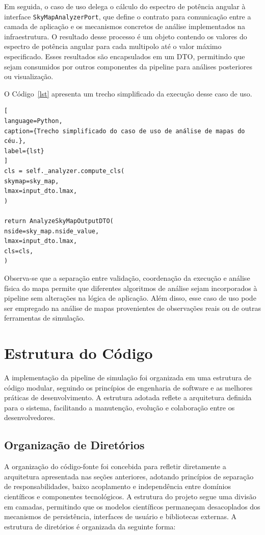 Em seguida, o caso de uso delega o cálculo do espectro de potência angular à interface \texttt{SkyMapAnalyzerPort}, que define o contrato para comunicação entre a camada de aplicação e os mecanismos concretos de análise implementados na infraestrutura. O resultado desse processo é um objeto contendo os valores do espectro de potência angular para cada multipolo até o valor máximo especificado. Esses resultados são encapsulados em um DTO, permitindo que sejam consumidos por outros componentes da pipeline para análises posteriores ou visualização.

O Código~\ref{lst} apresenta um trecho simplificado da execução desse caso de uso.


\begin{lstlisting}[
language=Python,
caption={Trecho simplificado do caso de uso de análise de mapas do céu.},
label={lst}
]
cls = self._analyzer.compute_cls(
skymap=sky_map,
lmax=input_dto.lmax,
)

return AnalyzeSkyMapOutputDTO(
nside=sky_map.nside_value,
lmax=input_dto.lmax,
cls=cls,
)
\end{lstlisting}

Observa-se que a separação entre validação, coordenação da execução e análise física do mapa permite que diferentes algoritmos de análise sejam incorporados à pipeline sem alterações na lógica de aplicação. Além disso, esse caso de uso pode ser empregado na análise de mapas provenientes de observações reais ou de outras ferramentas de simulação.



\section{Estrutura do Código}

A implementação da pipeline de simulação foi organizada em uma estrutura de código modular, seguindo os princípios de engenharia de software e as melhores práticas de desenvolvimento. A estrutura adotada reflete a arquitetura definida para o sistema, facilitando a manutenção, evolução e colaboração entre os desenvolvedores.

\subsection{Organização de Diretórios}

A organização do código-fonte foi concebida para refletir diretamente a arquitetura apresentada nas seções anteriores, adotando princípios de separação de responsabilidades, baixo acoplamento e independência entre domínios científicos e componentes tecnológicos. A estrutura do projeto segue uma divisão em camadas, permitindo que os modelos científicos permaneçam desacoplados dos mecanismos de persistência, interfaces de usuário e bibliotecas externas. A estrutura de diretórios é organizada da seguinte forma:

